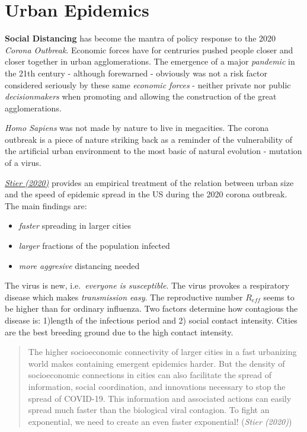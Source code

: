 \documentclass[
]{book}
\begin{document}
\hypertarget{urban-epidemics}{%
\chapter{Urban Epidemics}\label{urban-epidemics}}

\textbf{Social Distancing} has become the mantra of policy response to the 2020 \emph{Corona Outbreak}.
Economic forces have for centruries pushed people closer and closer together in urban agglomerations.
The emergence of a major \emph{pandemic} in the 21th century - although forewarned - obviously was not
a risk factor considered seriously by these same \emph{economic forces} - neither private nor public
\emph{decisionmakers} when promoting and allowing the construction of the great agglomerations.

\emph{Homo Sapiens} was not made by nature to live in megacities.
The corona outbreak is a piece of nature striking back as a reminder of the vulnerability of
the artificial urban environment to the most basic of natural evolution - mutation of a virus.

\href{https://arxiv.org/abs/2003.10376}{\emph{Stier (2020)}} provides an empirical treatment of the relation between
urban size and the speed of epidemic spread in the US during the 2020 corona outbreak.
The main findings are:

\begin{itemize}
\item
  \emph{faster} spreading in larger cities
\item
  \emph{larger} fractions of the population infected
\item
  \emph{more aggresive} distancing needed
\end{itemize}

The virus is new, i.e.~\emph{everyone is susceptible}.
The virus provokes a respiratory disease which makes \emph{transmission easy}.
The reproductive number \(R_{eff}\) seems to be higher than for ordinary influenza.
Two factors determine how contagious the disease is: 1)length of the infectious period
and 2) social contact intensity.
Cities are the best breeding ground due to the high contact intensity.

\begin{quote}
The higher socioeconomic connectivity of larger cities in a fast urbanizing world makes
containing emergent epidemics harder. But the density of socioeconomic connections in cities
can also facilitate the spread of information, social coordination, and innovations necessary to
stop the spread of COVID-19. This information and associated actions can easily spread much
faster than the biological viral contagion. To fight an exponential, we need to create an even
faster exponential! (\emph{Stier (2020)})
\end{quote}
\end{document}
